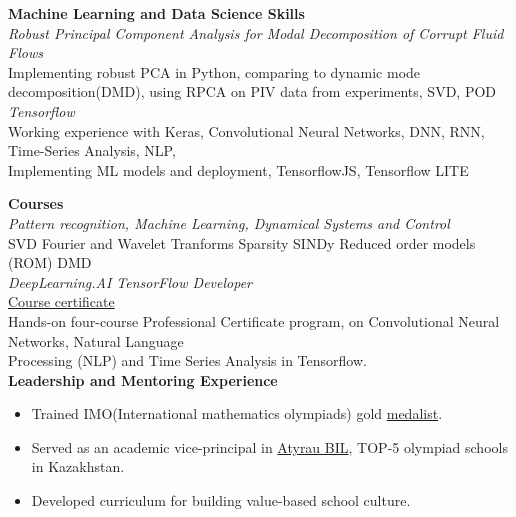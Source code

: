 \documentclass[10pt,letterpaper]{letter}
\newcommand{\gbullet}{\textcolor{gray}{\textbullet} }
\begin{document}

\textbf{Machine Learning and Data Science Skills}\\
\textit{Robust Principal Component Analysis for Modal Decomposition of Corrupt Fluid Flows}\\
\hspace*{10mm} Implementing robust PCA in Python, comparing to dynamic mode decomposition(DMD), using RPCA on PIV data
\hspace*{10mm} from experiments, SVD, POD\\
\textit{Tensorflow}\\
\hspace*{10mm}  Working experience with Keras, Convolutional Neural Networks, DNN, RNN, Time-Series Analysis, NLP,\\ 
\hspace*{10mm} Implementing ML models and deployment, TensorflowJS, Tensorflow LITE

\textbf{Courses}\\
\textit{Pattern recognition, Machine Learning, Dynamical Systems and Control}\\
\hspace*{10mm}  SVD \gbullet Fourier and Wavelet Tranforms \gbullet Sparsity \gbullet SINDy \gbullet Reduced order models (ROM) \gbullet DMD \\
\textit{DeepLearning.AI TensorFlow Developer}\\ \href{https://coursera.org/share/f65948fc03c3da5785b670010c27bbe4}{Course certificate}\\
\hspace*{10mm}  Hands-on four-course Professional Certificate program, on Convolutional Neural Networks, Natural Language \\ \hspace*{10mm} Processing (NLP) and Time Series Analysis in Tensorflow.\\


\textbf{Leadership and Mentoring Experience}
\begin{itemize}
	\item Trained IMO(International mathematics olympiads) gold \href{https://www.imo-official.org/participant_r.aspx?id=30786}{medalist}.
	\item Served as an academic vice-principal in \href{https://bil.edu.kz/en/}{Atyrau BIL}, TOP-5 olympiad schools in Kazakhstan. 
	\item  Developed curriculum for building value-based school culture. 
\end{itemize}
\end{document}
